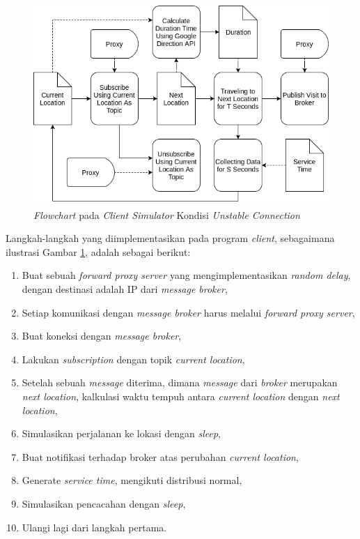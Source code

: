 \begin{figure}[!]
    \centering
    \includegraphics[width=\textwidth]{../../Resources/Images/client-algorithm-unstable-connection-field}
    \caption{\textit{Flowchart} pada \textit{Client Simulator} Kondisi \textit{Unstable Connection}}
    \label{fig:client-algorithm-unstable-connection-field}
\end{figure}


Langkah-langkah yang diimplementasikan pada program \textit{client}, sebagaimana ilustrasi Gambar \ref{fig:client-algorithm-unstable-connection-field}, adalah sebagai berikut:

\begin{enumerate}
\item Buat sebuah \textit{forward proxy server} yang mengimplementasikan \textit{random delay}, dengan destinasi adalah IP dari \textit{message broker}, 
\item Setiap komunikasi dengan \textit{message broker} harus melalui \textit{forward proxy server}, 
\item Buat koneksi dengan \textit{message broker}, 
\item Lakukan \textit{subscription} dengan topik \textit{current location}, 
\item Setelah sebuah \textit{message} diterima, dimana \textit{message} dari \textit{broker} merupakan \textit{next location}, kalkulasi waktu tempuh antara \textit{current location} dengan \textit{next location},
\item Simulasikan perjalanan ke lokasi dengan \textit{sleep},
\item Buat notifikasi terhadap broker atas perubahan \textit{current location}, 
\item Generate \textit{service time}, mengikuti distribusi normal, 
\item Simulasikan pencacahan dengan \textit{sleep}, 
\item Ulangi lagi dari langkah pertama.
\end{enumerate}


